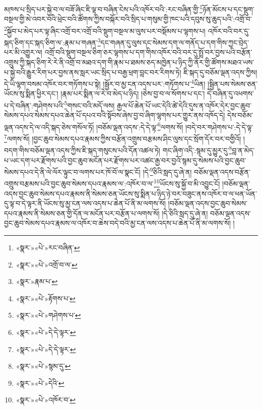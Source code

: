 མཁས་པ་སྲིད་པར་སྐྱེ་བ་ལ་བཟོ་ཞིང་ཇི་ལྟ་བ་བཞིན་ངེས་པའི་འཁོར་བའི་:རང་བཞིན་གྱི་\footnote{«སྣར་»«པེ་»རང་བཞིན་}ཉོན་མོངས་པ་དང་སྡུག་བསྔལ་གྱི་མེ་འབར་བའི་ཕྲེང་བའི་ཚོགས་ཀྱིས་བསྐོར་བའི་སྲིད་པ་གསུམ་གྱི་ཁང་པའི་དབུས་སུ་ཆུད་པའི་:འགྲོ་བ་\footnote{«སྣར་»«པེ་»འགྲོ་བ་ལ་}སྐྱོབ་པ་མེད་པར་ལྟ་ཞིང་འགྲོ་བར་འགྲོ་བའི་སྡུག་བསྔལ་མ་ལུས་པར་བསྡོམས་པ་ལྷགས་པ། འཁོར་བའི་བར་དུ་སྐད་ཅིག་དང་སྐད་ཅིག་ལ་:རྣམ་པ་གཞན་\footnote{«སྣར་»རྣམ་པ་}དང་གཞན་དུ་ལུས་དང་སེམས་དག་ལ་གནོད་པ་དག་གིས་ཀྱང་བྲེད་པར་མི་འགྱུར་ལ། འགྲོ་བའི་སྡུག་བསྔལ་ཅིག་ཅར་ལྷགས་པ་དག་གིས་འཁོར་བའི་བར་དུ་སྤྲོ་བར་བྱས་པའི་བརྩོན་འགྲུས་ཀྱི་སྐད་ཅིག་རེ་རེ་ནི་འགྲོ་བ་མཐའ་དག་གི་རྣམ་པ་ཐམས་ཅད་མཁྱེན་པ་ཉིད་ཀྱི་ནོར་གྱི་ཚོགས་མཐའ་ཡས་པ་སྐྱེ་བའི་རྒྱུར་རིག་པར་བྱས་ནས་སླར་ཡང་སྲིད་པ་བརྒྱ་ཕྲག་བླང་བར་རིགས་ཏེ། ཇི་སྐད་དུ་བཅོམ་ལྡན་འདས་ཀྱིས། དེ་ཡི་ལྷག་བསམ་འཁོར་བར་གཏོགས་པ་སྟེ། །སྦྱོར་བ་མྱ་ངན་འདས་པར་:གཏོགས་པ་\footnote{«སྣར་»«པེ་»རྟོགས་པ་}ཡིན། །སྦྱིན་པས་སེམས་ཅན་ཡོངས་སུ་སྨིན་ཕྱིར་དང་། །རྣམ་པར་སྨིན་ལ་རེ་བ་མེད་པ་ཉིད། །ཅེས་བྱ་བ་ལ་སོགས་པ་དང་། དེ་བཞིན་དུ་འཕགས་པ་དེ་བཞིན་:གཤེགས་པའི་\footnote{«སྣར་»«པེ་»གཤེགས་པ་}གསང་བའི་མདོ་ལས། རྒྱལ་པོ་ཆེན་པོ་ཡང་དེའི་ཚེ་དེའི་དུས་ན་འཁོར་དེར་བྱང་ཆུབ་སེམས་དཔའ་སེམས་དཔའ་ཆེན་པོ་དཔའ་བའི་སྟོབས་ཞེས་བྱ་བ་ཞིག་ལྷགས་པར་གྱུར་ནས་འཁོད་དེ། དེས་བཅོམ་ལྡན་འདས་དེ་ལ་འདི་སྐད་ཅེས་གསོལ་ཏོ། །བཅོམ་ལྡན་འདས་:དེ་དེ་ལྟ་\footnote{«སྣར་»«པེ་»དེ་དེ་ལྟར་}ལགས་སོ། །བདེ་བར་གཤེགས་པ་:དེ་དེ་ལྟ་\footnote{«སྣར་»«པེ་»དེ་དེ་ལྟར་}ལགས་སོ། །བྱང་ཆུབ་སེམས་དཔའ་རྣམས་ཀྱིས་བརྩོན་འགྲུས་བརྩམས་ཤིང་ལུས་དང་སྲོག་དོར་བར་བགྱིའོ། །བདག་གིས་བཅོམ་ལྡན་འདས་ཀྱིས་ཇི་སྐད་གསུངས་པའི་དོན་འཚལ་ཏེ། གང་ཞིག་འདི་:སྙམ་དུ་མྱུར་དུ་\footnote{«སྣར་»«པེ་»སྙམ་དུ་}བླ་ན་མེད་པ་ཡང་དག་པར་རྫོགས་པའི་བྱང་ཆུབ་མངོན་པར་རྫོགས་པར་འཚང་རྒྱ་བར་བྱའོ་སྙམ་དུ་སེམས་པའི་བྱང་ཆུབ་སེམས་དཔའ་དེ་ནི་ལེ་ལོར་ལྟུང་བ་ལགས་པར་ཁོ་བོ་ལ་སྣང་ངོ། །དེ་\footnote{«སྣར་»«པེ་»དེའི་}ཅིའི་སླད་དུ་ཞེ་ན། བཅོམ་ལྡན་འདས་བརྩོན་འགྲུས་བརྩམས་པའི་བྱང་ཆུབ་སེམས་དཔའ་རྣམས་ལ་:འཁོར་བ་ལ་\footnote{«སྣར་»«པེ་»འཁོར་བ་}ཡོངས་སུ་སྐྱོ་བ་མི་འབྱུང་ངོ། །བཅོམ་ལྡན་འདས་བྱང་ཆུབ་སེམས་དཔའ་རྣམས་ནི་སེམས་ཅན་ཡོངས་སུ་སྨིན་པ་ཉིད་ཉེ་བར་བཟུང་ནས་འཁོར་བ་ལ་ཕན་ཡོན་དུ་ལྟ་བ་དེ་ལྟར་ནི་ཡོངས་སུ་མྱ་ངན་ལས་འདས་པ་ཆེན་པོ་ནི་མ་ལགས་སོ། །བཅོམ་ལྡན་འདས་བྱང་ཆུབ་སེམས་དཔའ་རྣམས་ནི་སེམས་ཅན་གྱི་དོན་ལ་མངོན་པར་བརྩོན་པ་ལགས་སོ། །དེ་ཅིའི་སླད་དུ་ཞེ་ན། བཅོམ་ལྡན་འདས་བྱང་ཆུབ་སེམས་དཔའ་རྣམས་ལ་འཁོར་བ་ཆེས་བདེ་བའི་མྱ་ངན་ལས་འདས་པ་ཆེན་པོ་ནི་མ་ལགས་སོ། །
